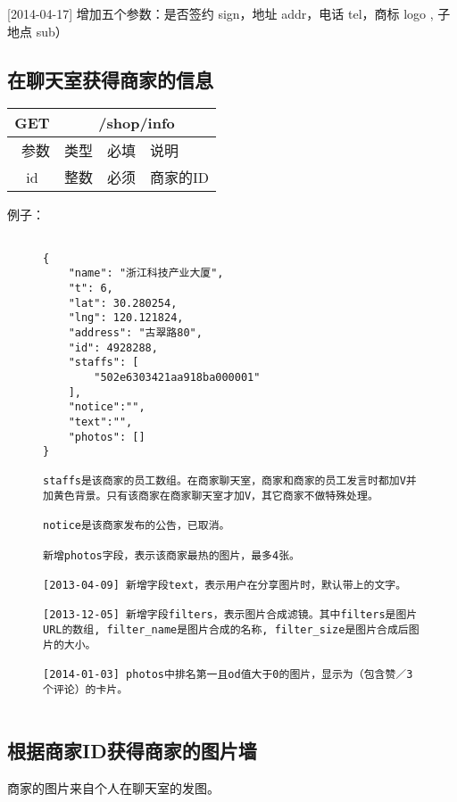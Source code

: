 \documentclass[cs4size]{ctexartutf8}
\begin{document}
[2014-04-17] 增加五个参数：是否签约 sign，地址 addr，电话 tel，商标 logo , 子地点 sub）

\subsection{在聊天室获得商家的信息}

\begin{table}[H]
   \begin{center}
\begin{tabular}{|c|c|c|p{12cm}|}
\hline
GET & \multicolumn{3}{|c|}{/shop/info} \\
\hline\hline
 \  参数  & 类型 & 必填 &  说明  \\
\hline
 id  & 整数 & 必须 & 商家的ID\\
\hline
\end{tabular}
   \end{center}
\end{table}

例子：

\begin{figure}[H]
\begin{verbatim}

{
    "name": "浙江科技产业大厦",
    "t": 6,
    "lat": 30.280254,
    "lng": 120.121824,
    "address": "古翠路80",
    "id": 4928288,
    "staffs": [
        "502e6303421aa918ba000001"
    ],
    "notice":"",
    "text":"",    
    "photos": []
}

staffs是该商家的员工数组。在商家聊天室，商家和商家的员工发言时都加V并加黄色背景。只有该商家在商家聊天室才加V，其它商家不做特殊处理。

notice是该商家发布的公告，已取消。

新增photos字段，表示该商家最热的图片，最多4张。

[2013-04-09] 新增字段text，表示用户在分享图片时，默认带上的文字。

[2013-12-05] 新增字段filters，表示图片合成滤镜。其中filters是图片URL的数组, filter_name是图片合成的名称, filter_size是图片合成后图片的大小。

[2014-01-03] photos中排名第一且od值大于0的图片，显示为（包含赞／3个评论）的卡片。


\end{verbatim}
\end{figure}



\subsection{根据商家ID获得商家的图片墙}
商家的图片来自个人在聊天室的发图。\label{photowall}
\end{document}
